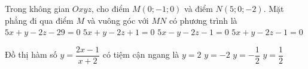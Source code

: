 \begin{ex}%
	Trong không gian $Oxyz$, cho điểm $M(0;-1;0)$ và điểm $N(5;0;-2)$. Mặt phẳng đi qua điểm $M$ và vuông góc với $MN$ có phương trình là
	\choice
	{$5x+y-2z-29=0$}
	{\True $5x+y-2z+1=0$}
	{$5x-y-2z-1=0$}
	{$5x+y-2z-1=0$}
\end{ex}

\begin{ex}%
	Đồ thị hàm số $y=\dfrac{2x-1}{x+2}$ có tiệm cận ngang là
	\choice
	{\True $y=2$}
	{$y=-2$}
	{$y=-\dfrac{1}{2}$}
	{$y=\dfrac{1}{2}$}
\end{ex}



